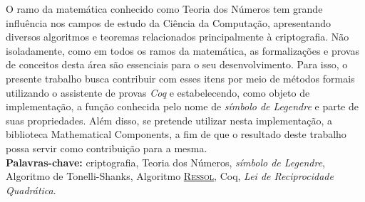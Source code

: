 \setlength{\absparsep}{18pt}
\begin{resumo}

        \noindent
        O ramo da matemática conhecido como Teoria dos Números tem grande influência nos campos de estudo da Ciência da Computação, apresentando diversos algoritmos e teoremas relacionados principalmente à criptografia. Não isoladamente, como em todos os ramos da matemática, as formalizações e provas de conceitos desta área são essenciais para o seu desenvolvimento. Para isso, o presente trabalho busca contribuir com esses itens por meio de métodos formais utilizando o assistente de provas \textit{Coq} e estabelecendo, como objeto de implementação, a função conhecida pelo nome de \textit{símbolo de Legendre} e parte de suas propriedades. Além disso, se pretende utilizar nesta implementação, a biblioteca Mathematical Components, a fim de que o resultado deste trabalho possa servir como contribuição para a mesma.\\


        
        \textbf{Palavras-chave:} criptografia, Teoria dos Números, \textit{símbolo de Legendre}, Algoritmo de Tonelli-Shanks, Algoritmo \hyperref[algo:ressol]{\textsc{Ressol}}, Coq, \textit{Lei de Reciprocidade Quadrática}.
\end{resumo}